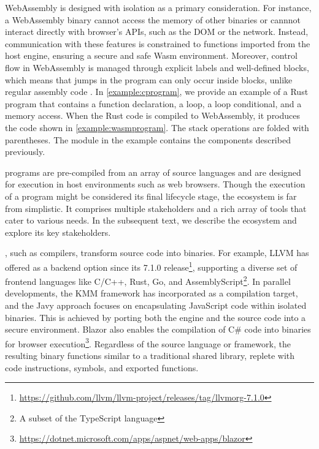 WebAssembly is designed with isolation as a primary consideration. For instance, a WebAssembly binary cannot access the memory of other binaries or cannnot interact directly with browser's APIs, such as the DOM or the network. Instead, communication with these features is constrained to functions imported from the host engine, ensuring a secure and safe Wasm environment.
Moreover, control flow in WebAssembly is managed through explicit labels and well-defined blocks, which means that jumps in the program can only occur inside blocks, unlike regular assembly code \cite{10.1145/3062341.3062363}. 
In \autoref{example:cprogram}, we provide an example of a Rust program that contains a function declaration, a loop, a loop conditional, and a memory access. When the Rust code is compiled to WebAssembly, it produces the code shown in \autoref{example:wasmprogram}. The stack operations are folded with parentheses.
The module in the example contains the components described previously.


\label{background:wasm:ecosystems}


\Wasm programs are pre-compiled from an array of source languages and are designed for execution in host environments such as web browsers.
Though the execution of a \Wasm program might be considered its final lifecycle stage, the \Wasm ecosystem is far from simplistic.
It comprises multiple stakeholders and a rich array of tools that cater to various needs.
In the subsequent text, we describe the \Wasm ecosystem and explore its key stakeholders.

, such as compilers, transform source code into \Wasm binaries. 
For example, LLVM has offered \Wasm as a backend option since its 7.1.0 release\footnote{\url{https://github.com/llvm/llvm-project/releases/tag/llvmorg-7.1.0}}, supporting a diverse set of frontend languages like C/C++, Rust, Go, and AssemblyScript\footnote{A subset of the TypeScript language}.
In parallel developments, the KMM framework\cite{kmm} has incorporated \Wasm as a compilation target, and the Javy approach\cite{Javy} focuses on encapsulating JavaScript code within isolated \Wasm binaries. 
This is achieved by porting both the engine and the source code into a secure \Wasm environment. 
Blazor also enables the compilation of C# code into \Wasm binaries for browser execution\footnote{\url{https://dotnet.microsoft.com/apps/aspnet/web-apps/blazor}}.
Regardless of the source language or framework, the resulting \Wasm binary functions similar to a traditional shared library, replete with code instructions, symbols, and exported functions.


